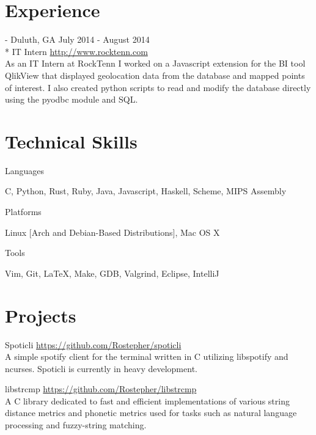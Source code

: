 \documentclass[letterpaper,margin,line,11pt]{resume}
\newcommand{\rurl}[1]{\hfill {\footnotesize \url{#1}}}
\newcommand{\rdate}[1]{\hfill {\small #1}}
\newcommand{\tab}[1]{\hspace{1em}}
\renewcommand{\employer}[5]{\item[#1] - #2 \rdate{#3} \\* #4 \rurl{#5}}
\begin{document}
\begin{resume}
\section{\mysidestyle Experience}
	\begin{asparadesc}
        \employer{RockTenn}{Duluth, GA}{July 2014 - August 2014}{IT Intern}{http://www.rocktenn.com}
        \vspace{1em}\\
        As an IT Intern at RockTenn I worked on a Javascript extension for the BI tool QlikView that displayed geolocation data from the database and mapped points of interest. I also created python scripts to read and modify the database directly using the pyodbc module and SQL.
        \normalsize
	\end{asparadesc}

\section{\mysidestyle Technical Skills}
	\begin{compactdesc}
		\item[Languages]
			\item\tab{} C, Python, Rust, Ruby, Java, Javascript, Haskell, Scheme, MIPS Assembly
			\vspace{1em}
		\item[Platforms]
			\item\tab{} Linux [Arch and Debian-Based Distributions], Mac OS X
			\vspace{1em}
		\item[Tools]
			\item\tab{} Vim, Git, \LaTeX, Make, GDB, Valgrind, Eclipse, IntelliJ
	\end{compactdesc}

\section{\mysidestyle Projects}
	\begin{compactdesc}
		\item[Spoticli] \rurl{https://github.com/Rostepher/spoticli}
		\\
		A simple spotify client for the terminal written in C utilizing libspotify and ncurses. Spoticli is currently in heavy development.

		\vspace{1em}

        \item[libstrcmp] \rurl{https://github.com/Rostepher/libstrcmp}
        \\
        A C library dedicated to fast and efficient implementations of various string distance metrics and phonetic metrics used for tasks such as natural language processing and fuzzy-string matching.
	\end{compactdesc}


\end{resume}
\end{document}
